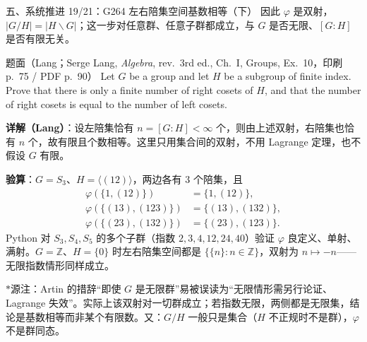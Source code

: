 \documentclass[aspectratio=169,10pt,fontset=none]{ctexbeamer}
\newcommand{\key}[1]{\textcolor{ink}{\bfseries #1}}
\newcommand{\starpt}{\textcolor{accent}{\bfseries$\ast$}}
\begin{document}
\begin{frame}[t]{五、系统推进 19/21：G264 左右陪集空间基数相等（下）}
\scriptsize
因此 $\varphi$ 是双射，$|G/H|=|H\backslash G|$；这一步对任意群、任意子群都成立，与 $G$ 是否无限、$[G:H]$ 是否有限无关。

\begin{block}{\footnotesize 题面（Lang；Serge Lang, \emph{Algebra}, rev.\ 3rd ed., Ch.~I, Groups, Ex.~10，印刷 p.~75 / PDF p.~90）}
Let $G$ be a group and let $H$ be a subgroup of finite index. Prove that there is only a finite number of right cosets of $H$, and that the number of right cosets is equal to the number of left cosets.
\end{block}
\key{详解（Lang）}：设左陪集恰有 $n=[G:H]<\infty$ 个，则由上述双射，右陪集也恰有 $n$ 个，故有限且个数相等。这里只用集合间的双射，不用 Lagrange 定理，也不假设 $G$ 有限。

\key{验算}：$G=S_3$、$H=\langle(12)\rangle$，两边各有 $3$ 个陪集，且
\[
\begin{aligned}
\varphi(\{1,(12)\})&=\{1,(12)\},\\
\varphi(\{(13),(123)\})&=\{(13),(132)\},\\
\varphi(\{(23),(132)\})&=\{(23),(123)\}.
\end{aligned}
\]
Python 对 $S_3,S_4,S_5$ 的多个子群（指数 $2,3,4,12,24,40$）验证 $\varphi$ 良定义、单射、满射。$G=\mathbb Z$、$H=\{0\}$ 时左右陪集空间都是 $\{\{n\}:n\in\mathbb Z\}$，双射为 $n\mapsto-n$——无限指数情形同样成立。

\starpt 源注：Artin 的措辞“即使 $G$ 是无限群”易被误读为“无限情形需另行论证、Lagrange 失效”。实际上该双射对一切群成立；若指数无限，两侧都是无限集，结论是基数相等而非某个有限数。又：$G/H$ 一般只是集合（$H$ 不正规时不是群），$\varphi$ 不是群同态。
\end{frame}
\end{document}
